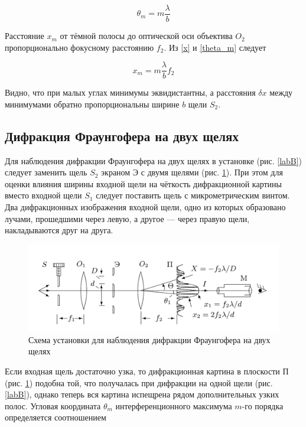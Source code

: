 \documentclass[a4paper,12pt]{article}
\begin{document}
\begin{equation}\label{theta_m}
\theta_m = m \dfrac{\lambda}{b}
\end{equation}

Расстояние $ x_m $ от тёмной полосы до оптической оси объектива $ O_2 $ пропорционально фокусному расстоянию $ f_2 $. Из \eqref{x} и \eqref{theta_m} следует 

\begin{equation}\label{xm}
x_m = m \dfrac{\lambda}{b} f_2
\end{equation}

Видно, что при малых углах минимумы эквидистантны, а расстояния $ \delta x $ между минимумами обратно пропорциональны ширине $ b $ щели $ S_2 $.



\subsection{Дифракция Фраунгофера на двух щелях}

Для наблюдения дифракции Фраунгофера на двух щелях в установке (рис. \ref{labB}) следует заменить щель $ S_2 $ экраном Э с двумя щелями
(рис. \ref{labC}). При этом для оценки влияния ширины входной щели на чёткость дифракционной картины вместо входной щели $ S_1 $ следует поставить щель с микрометрическим винтом. Два дифракционных изображения входной щели, одно из которых образовано лучами, прошедшими через левую, а другое --- через правую щели, накладываются друг на друга.

\begin{figure}[H]
	\centering
	\includegraphics[scale=0.7]{две щели.png}
	\caption{Схема установки для наблюдения дифракции Фраунгофера на двух щелях}
	\label{labC}
\end{figure}

Если входная щель достаточно узка, то дифракционная картина
в плоскости П (рис. \ref{labC}) подобна той, что получалась при дифракции
на одной щели (рис. \ref{labB}), однако теперь вся картина испещрена рядом
дополнительных узких полос.
Угловая координата $ \theta_m $ интерференционного максимума $ m $-го порядка определяется соотношением
\end{document}
